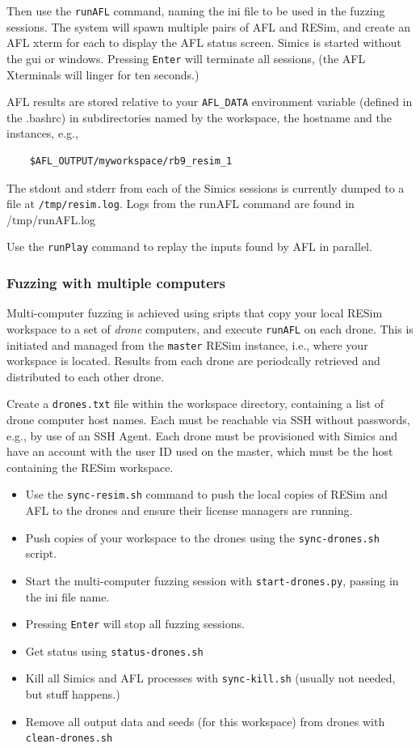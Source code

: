 \documentclass[titlepage]{article}
\begin{document}
Then use the {\tt runAFL} command, naming the ini file to be used in the fuzzing sessions.  The system will spawn multiple pairs of
AFL and RESim, and create an AFL xterm for each to display the AFL status screen.  Simics is started without the gui or windows.
Pressing {\tt Enter} will terminate all sessions, (the AFL Xterminals will linger for ten seconds.)

AFL results are stored relative to your {\tt AFL\_DATA} environment variable (defined in the .bashrc) in subdirectories named by the workspace, the hostname and the instances, e.g.,
\begin{verbatim}
    $AFL_OUTPUT/myworkspace/rb9_resim_1
\end{verbatim}
The stdout and stderr from each of the Simics sessions is currently dumped to a file at {\tt /tmp/resim.log}.
Logs from the runAFL command are found in /tmp/runAFL.log

Use the {\tt runPlay} command to replay the inputs found by AFL in parallel.

\subsubsection{Fuzzing with multiple computers}
\label{fuzz-drones}
Multi-computer fuzzing is achieved using sripts that copy your local RESim workspace to a set of \textit{drone} computers,
and execute {\tt runAFL} on each drone.  This is initiated and managed from the {\tt master} RESim instance, i.e., where your 
workspace is located.  Results from each drone are periodcally retrieved and distributed to each other drone.

Create a {\tt drones.txt} file within the workspace directory, containing a list of drone computer host names.  Each must be reachable
via SSH without passwords, e.g., by use of an SSH Agent.  Each drone must be provisioned with Simics and have an account with the user ID used
on the master, which must be the host containing the RESim workspace. 
\begin{itemize}
\item Use the {\tt sync-resim.sh} command to push the local copies of RESim and AFL to the drones and ensure their license managers are running.
\item Push copies of your workspace to the drones using the {\tt sync-drones.sh} script.
\item Start the multi-computer fuzzing session with {\tt start-drones.py}, passing in the ini file name.
\item Pressing {\tt Enter} will stop all fuzzing sessions.
\item Get status using {\tt status-drones.sh}
\item Kill all Simics and AFL processes with {\tt sync-kill.sh} (usually not needed, but stuff happens.)
\item Remove all output data and seeds (for this workspace) from drones with {\tt clean-drones.sh}
\end{itemize}
\end{document}
